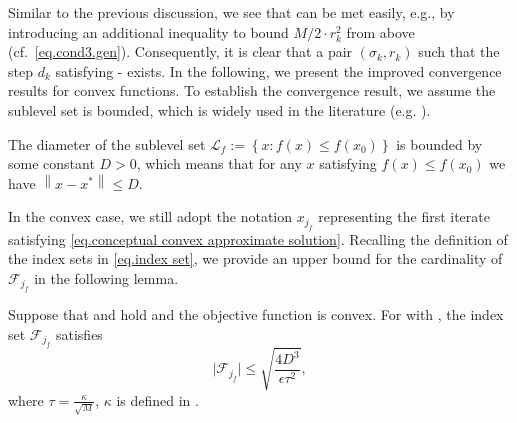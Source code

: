 Similar to the previous discussion, we see that  can be met easily, e.g., by introducing an additional inequality to bound $M/2 \cdot r_k^2$ from above (cf.~\eqref{eq.cond3.gen}). Consequently, it is clear that a pair $(\sigma_k, r_k)$ such that the step $d_k$ satisfying - exists. In the following, we present the improved convergence results for convex functions. To establish the convergence result, we assume the sublevel set is bounded, which is widely used in the literature (e.g. \cite{nesterov2006cubic,doikov_super-universal_2024}).
\begin{assumption}\label{assm.conceptual bounded set}
    The diameter of the sublevel set $\mathcal{L}_f := \left\{x: f(x) \leq f(x_0)\right\}$ is bounded by some constant $D>0$, which means that for any $x$ satisfying $f(x) \leq f(x_0)$ we have $\left\|x-x^*\right\| \leq D$.
\end{assumption}
In the convex case, we still adopt the notation $x_{j_f}$ representing the first iterate satisfying \eqref{eq.conceptual convex approximate solution}.
Recalling the definition of the index sets in \eqref{eq.index set}, we provide an upper bound for the cardinality of $\mathcal{F}_{j_f}$ in the following lemma.
\begin{lemma}\label{lem.conceptual cvx function descend}
    Suppose that  and  hold and the objective function is convex. For  with  ,  the index set $\mathcal{F}_{j_f}$ satisfies
    \label{lem.conceptual convex bound n}
    \begin{equation}
        \label{eq.conceptual convex bound n}
        \vert \mathcal{F}_{j_f}\vert \leq \sqrt{\frac{4D^3}{\epsilon\tau^2}},
    \end{equation}
    where $\tau = \frac{\kappa}{\sqrt{M}}$, $\kappa$ is defined in .
\end{lemma}
